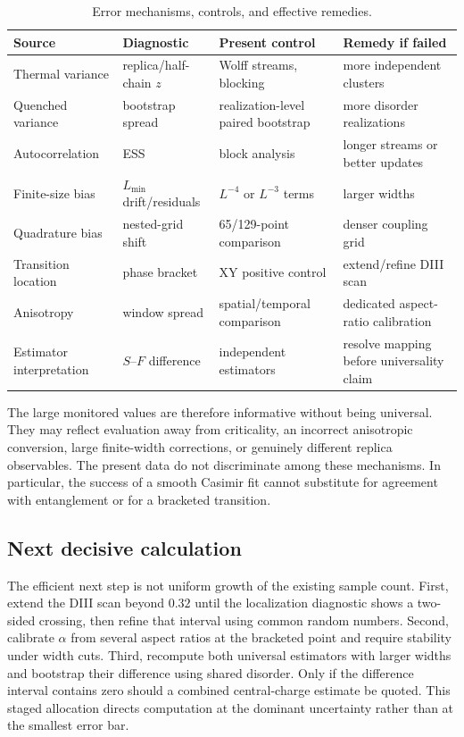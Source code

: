 \documentclass[aps,prb,reprint,superscriptaddress,longbibliography,floatfix]{revtex4-2}
\begin{document}
\begin{table}[t]
\caption{Error mechanisms, controls, and effective remedies.}
\label{tab:04-errors}
\begin{ruledtabular}
\begin{tabular}{llll}
Source & Diagnostic & Present control & Remedy if failed\\
\hline
Thermal variance & replica/half-chain $z$ & Wolff streams, blocking
 & more independent clusters\\
Quenched variance & bootstrap spread & realization-level paired bootstrap
 & more disorder realizations\\
Autocorrelation & ESS & block analysis & longer streams or better updates\\
Finite-size bias & $L_{\min}$ drift/residuals & $L^{-4}$ or $L^{-3}$ terms
 & larger widths\\
Quadrature bias & nested-grid shift & 65/129-point comparison
 & denser coupling grid\\
Transition location & phase bracket & XY positive control
 & extend/refine DIII scan\\
Anisotropy & window spread & spatial/temporal comparison
 & dedicated aspect-ratio calibration\\
Estimator interpretation & $S$--$F$ difference & independent estimators
 & resolve mapping before universality claim\\
\end{tabular}
\end{ruledtabular}
\end{table}

The large monitored values are therefore informative without being universal.
They may reflect evaluation away from criticality, an incorrect anisotropic
conversion, large finite-width corrections, or genuinely different replica
observables.  The present data do not discriminate among these mechanisms.
In particular, the success of a smooth Casimir fit cannot substitute for
agreement with entanglement or for a bracketed transition.

\subsection{Next decisive calculation}

The efficient next step is not uniform growth of the existing sample count.
First, extend the DIII scan beyond $0.32$ until the localization diagnostic
shows a two-sided crossing, then refine that interval using common random
numbers.  Second, calibrate $\alpha$ from several aspect ratios at the
bracketed point and require stability under width cuts.  Third, recompute both
universal estimators with larger widths and bootstrap their difference using
shared disorder.  Only if the difference interval contains zero should a
combined central-charge estimate be quoted.  This staged allocation directs
computation at the dominant uncertainty rather than at the smallest error bar.
\end{document}
